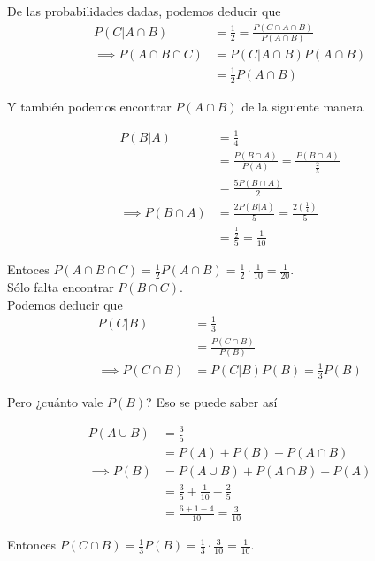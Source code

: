 \documentclass[12pt,a4paper]{report}
\begin{document}
\begin{enumerate}
{\begin{enumerate}[label=\alph*) ]
{			De las probabilidades dadas, podemos deducir que
			\begin{align*}
				P(C|A\cap B) &= \frac{1}{2} = \frac{P(C \cap A \cap B)}{P(A \cap B)}  \\
				\implies  P(A \cap B \cap C) &= P(C|A\cap B) P(A \cap B)\\
																		 &= \frac{1}{2} P(A \cap B)
			\end{align*}

			Y también podemos encontrar $P(A \cap B)$ de la siguiente manera

			\begin{align*}
				P(B|A) &= \frac{1}{4} \\
							 &= \frac{P(B \cap A)}{P(A)} = \frac{P(B \cap A)}{\frac{2}{5}}\\
							 &= \frac{5P(B \cap A)}{2}\\
				\implies P(B \cap A) &= \frac{2P(B|A)}{5} = \frac{2(\frac{1}{4})}{5}\\
							 &= \frac{\frac{1}{2}}{5} = \frac{1}{10}
			\end{align*}

			Entoces $P(A\cap B \cap C) = \frac{1}{2} P(A \cap B) = \frac{1}{2} \cdot \frac{1}{10} = \frac{1}{20}$.\\

			Sólo falta encontrar $P(B \cap C)$.\\

			Podemos deducir que
			\begin{align*}
				P(C|B) &= \frac{1}{3}\\
							 &= \frac{P(C \cap B)}{P(B)}\\
				\implies P(C \cap B) &= 	P(C|B) P(B) = \frac{1}{3} P(B)
			\end{align*}

			Pero ¿cuánto vale $P(B)$? Eso se puede saber así

			\begin{align*}
				P(A\cup B) &= \frac{3}{5}\\
									 &= P(A) + P(B) - P(A \cap B)\\
				\implies P(B) &= P(A\cup B) + P(A \cap B) - P(A)\\
									 &= \frac{3}{5} + \frac{1}{10} - \frac{2}{5}\\
									 &= \frac{6+1-4}{10} = \frac{3}{10}
			\end{align*}

			Entonces $P(C \cap B) = \frac{1}{3}P(B) = \frac{1}{3} \cdot \frac{3}{10} = \frac{1}{10}$.\\

}
\end{enumerate}}
\end{enumerate}
\end{document}
